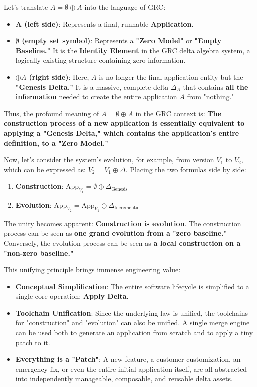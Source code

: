 \documentclass[11pt]{article}
\begin{document}
Let's translate $A = \emptyset \oplus A$ into the language of GRC:
\begin{itemize}
    \item \textbf{A (left side)}: Represents a final, runnable \textbf{Application}.
    \item \textbf{$\emptyset$ (empty set symbol)}: Represents a \textbf{"Zero Model"} or \textbf{"Empty Baseline."} It is the \textbf{Identity Element} in the GRC delta algebra system, a logically existing structure containing zero information.
    \item \textbf{$\oplus A$ (right side)}: Here, $A$ is no longer the final application entity but the \textbf{"Genesis Delta."} It is a massive, complete delta $\Delta_A$ that contains \textbf{all the information} needed to create the entire application $A$ from "nothing."
\end{itemize}

Thus, the profound meaning of $A = \emptyset \oplus A$ in the GRC context is:
\textbf{The construction process of a new application is essentially equivalent to applying a "Genesis Delta," which contains the application's entire definition, to a "Zero Model."}

Now, let's consider the system's evolution, for example, from version $V_1$ to $V_2$, which can be expressed as: $V_2 = V_1 \oplus \Delta$. Placing the two formulas side by side:

\begin{enumerate}
    \item \textbf{Construction}: $\text{App}_{V_1} = \emptyset \oplus \Delta_{\text{Genesis}}$
    \item \textbf{Evolution}: $\text{App}_{V_2} = \text{App}_{V_1} \oplus \Delta_{\text{Incremental}}$
\end{enumerate}

The unity becomes apparent: \textbf{Construction is evolution}. The construction process can be seen as \textbf{one grand evolution from a "zero baseline."} Conversely, the evolution process can be seen as \textbf{a local construction on a "non-zero baseline."}

This unifying principle brings immense engineering value:
\begin{itemize}
    \item \textbf{Conceptual Simplification}: The entire software lifecycle is simplified to a single core operation: \textbf{Apply Delta}.
    \item \textbf{Toolchain Unification}: Since the underlying law is unified, the toolchains for "construction" and "evolution" can also be unified. A single merge engine can be used both to generate an application from scratch and to apply a tiny patch to it.
    \item \textbf{Everything is a "Patch"}: A new feature, a customer customization, an emergency fix, or even the entire initial application itself, are all abstracted into independently manageable, composable, and reusable delta assets.
\end{itemize}
\end{document}
